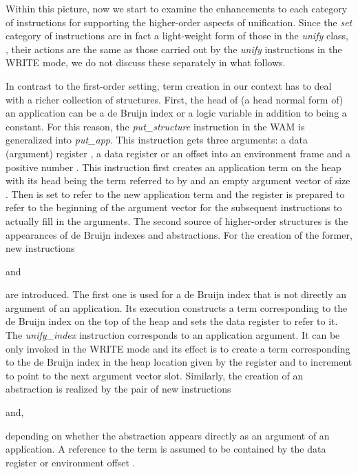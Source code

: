 Within this picture, now we start to examine the enhancements to each
category of instructions for supporting the higher-order aspects
of unification.
Since the {\it set} category of instructions are in
fact a light-weight form of those in the {\it unify} class, \ie,
their actions are the same as those carried out
by the {\it unify} instructions in the WRITE mode, we do not discuss
these separately in what follows.

In contrast to the first-order setting, term creation in our context
has to deal with a
richer collection of structures. First, the head of (a head normal form of)
an application can be a de Bruijn index or a logic variable in
addition to being a constant.
For this reason, the {\it put\_structure} instruction in the WAM is
generalized into {\it put\_app}. This instruction gets three
arguments: a data (argument) register , a data register or an
offset into an environment frame  and a positive number .
This instruction first creates an application term on the
heap with its head being the term referred to by  and an empty argument
vector of size . Then  is set to refer to the new application term
and the  register
is prepared to refer to the beginning of the argument vector for the subsequent
instructions to actually fill in the arguments.
The second source of higher-order structures is the appearances of de Bruijn
indexes and abstractions. For the creation of the former, new instructions
\begin{tabbing}
 \dquad and
\end{tabbing}
are introduced. The first one is used for a de Bruijn index
that is not directly an argument of an application. Its execution
constructs a term corresponding to the de Bruijn index  on the top
of the heap and sets the data register  to refer to it.
The {\it unify\_index} instruction corresponds to an application argument.
It can be only invoked in the WRITE mode and its effect is to create
a term corresponding to the de Bruijn index  in the
heap location given by the register  and to increment  to point
to the next argument vector slot.
Similarly, the creation of an abstraction  is realized by
the pair of new instructions
\begin{tabbing}
 \dquad and,
\end{tabbing}
depending on whether the abstraction appears directly as an argument of an
application. A reference to the term  is assumed to be contained by the data
register or environment offset .

